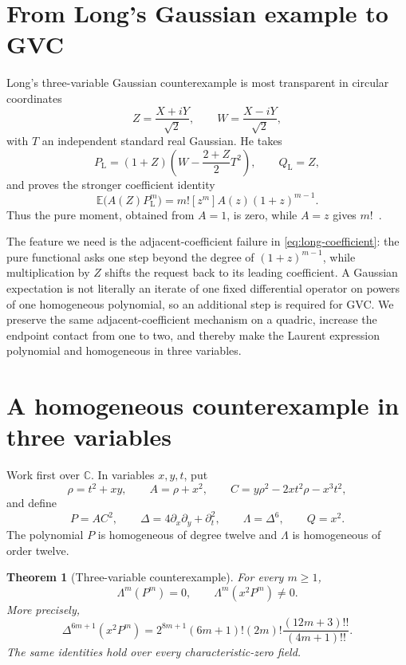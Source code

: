 \documentclass[11pt]{article}
\newtheorem{theorem}{Theorem}[section]
\begin{document}
\section{From Long's Gaussian example to GVC}

Long's three-variable Gaussian counterexample is most transparent in
circular coordinates
\[
 Z=\frac{X+iY}{\sqrt2},\qquad
 W=\frac{X-iY}{\sqrt2},
\]
with $T$ an independent standard real Gaussian.  He takes
\begin{equation}\label{eq:long}
 P_{\mathrm L}=(1+Z)\left(W-\frac{2+Z}{2}T^2\right),
 \qquad Q_{\mathrm L}=Z,
\end{equation}
and proves the stronger coefficient identity
\begin{equation}\label{eq:long-coefficient}
 \mathbb E\bigl(A(Z)P_{\mathrm L}^m\bigr)
 =m![z^m]A(z)(1+z)^{m-1}.
\end{equation}
Thus the pure moment, obtained from $A=1$, is zero, while $A=z$ gives
$m!$~\cite{LongGMC}.

The feature we need is the adjacent-coefficient failure in
\eqref{eq:long-coefficient}: the pure functional asks one step beyond the
degree of $(1+z)^{m-1}$, while multiplication by $Z$ shifts the request
back to its leading coefficient.  A Gaussian expectation is not literally
an iterate of one fixed differential operator on powers of one homogeneous
polynomial, so an additional step is required for GVC.  We preserve the
same adjacent-coefficient mechanism on a quadric, increase the endpoint
contact from one to two, and thereby make the Laurent expression
polynomial and homogeneous in three variables.

\section{A homogeneous counterexample in three variables}

Work first over $\mathbb C$.  In variables $x,y,t$, put
\begin{equation}\label{eq:gvc3-data}
 \rho=t^2+xy,
 \qquad A=\rho+x^2,
 \qquad C=y\rho^2-2xt^2\rho-x^3t^2,
\end{equation}
and define
\begin{equation}\label{eq:gvc3-pair}
 P=AC^2,
 \qquad
 \Delta=4\partial_x\partial_y+\partial_t^2,
 \qquad
 \Lambda=\Delta^6,
 \qquad Q=x^2.
\end{equation}
The polynomial $P$ is homogeneous of degree twelve and $\Lambda$ is
homogeneous of order twelve.

\begin{theorem}[Three-variable counterexample]\label{thm:gvc3}
For every $m\geq1$,
\begin{equation}\label{eq:gvc3-pure-mixed}
 \Lambda^m(P^m)=0,
 \qquad
 \Lambda^m(x^2P^m)\ne0.
\end{equation}
More precisely,
\begin{equation}\label{eq:gvc3-exact}
 \Delta^{6m+1}(x^2P^m)
 =2^{8m+1}(6m+1)!(2m)!
   \frac{(12m+3)!!}{(4m+1)!!}.
\end{equation}
The same identities hold over every characteristic-zero field.
\end{theorem}
\end{document}
